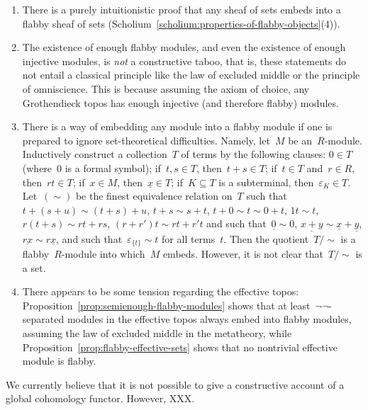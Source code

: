 \documentclass[oneside]{amsart}
\theoremstyle{definition}
\theoremstyle{plain}
\theoremstyle{remark}
\renewcommand{\_}{\mathpunct{.}\,}
\begin{document}
\begin{enumerate}
\item There is a purely intuitionistic proof that any sheaf of sets embeds into
a flabby sheaf of sets
(Scholium~\ref{scholium:properties-of-flabby-objects}(4)).

\item The existence of enough flabby modules, and even the existence of enough
injective modules, is \emph{not} a constructive taboo, that is, these statements do not
entail a classical principle like the law of excluded middle or the principle
of omniscience. This is because assuming the axiom of choice, any
Grothendieck topos has enough injective (and therefore flabby) modules. 

\item There is a way of embedding any module into a flabby module if one is
prepared to ignore set-theoretical difficulties. Namely, let~$M$ be an~$R$-module.
Inductively construct a collection~$T$ of terms by the following clauses: $0
\in T$ (where~$0$ is a formal symbol);
if~$t,s \in T$, then~$t + s \in T$; if~$t \in T$ and~$r \in R$, then~$rt \in
T$; if~$x \in M$, then~$\underline{x} \in T$; if~$K \subseteq T$ is a
subterminal, then~$\varepsilon_K \in T$. Let~$({\sim})$ be
the finest equivalence relation on~$T$ such that~$t + (s + u) \sim (t + s) +
u$, $t + s \sim s + t$, $t + 0 \sim t \sim 0 + t$, $1t \sim t$, $r(t+s) \sim rt
+ rs$, $(r+r')t \sim rt + r't$ and such
that~$\underline{0} \sim 0$, $\underline{x+y} \sim \underline{x} + \underline{y}$, $\underline{rx} \sim
r \underline{x}$, and such that~$\varepsilon_{\{t\}} \sim
t$ for all terms~$t$. Then the quotient~$T/{\sim}$ is a flabby~$R$-module
into which~$M$ embeds. However, it is not clear that~$T/{\sim}$ is a set.

\item There appears to be some tension regarding the effective topos:
Proposition~\ref{prop:semienough-flabby-modules} shows that at
least~$\neg\neg$-separated modules in the effective topos always embed into
flabby modules, assuming the law of excluded middle in the metatheory, while
Proposition~\ref{prop:flabby-effective-sets} shows that no nontrivial effective
module is flabby.
\end{enumerate}

We currently believe that it is not possible to give a constructive account of
a global cohomology functor. However, XXX.
\end{document}
